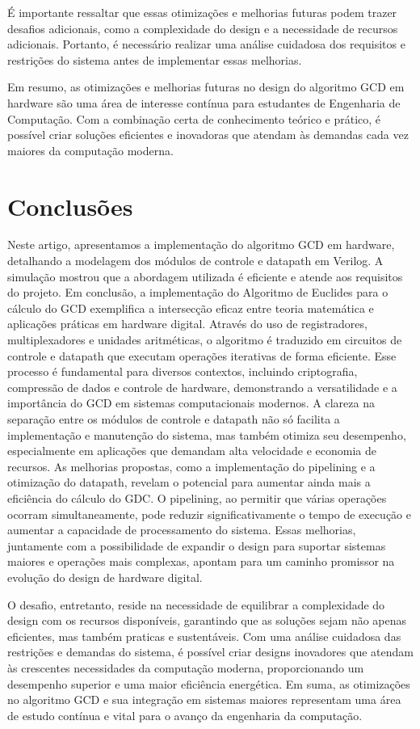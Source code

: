 \documentclass[a4paper,11pt]{article} %
\begin{document}
É importante ressaltar que essas otimizações e melhorias futuras podem trazer desafios adicionais, como a complexidade do design e a necessidade de recursos adicionais. Portanto, é necessário realizar uma análise cuidadosa dos requisitos e restrições do sistema antes de implementar essas melhorias.


Em resumo, as otimizações e melhorias futuras no design do algoritmo GCD em hardware são uma área de interesse contínua para estudantes de Engenharia de Computação. Com a combinação certa de conhecimento teórico e prático, é possível criar soluções eficientes e inovadoras que atendam às demandas cada vez maiores da computação moderna.


\section{Conclusões}

Neste artigo, apresentamos a implementação do algoritmo GCD em hardware, detalhando a modelagem dos módulos de controle e datapath em Verilog. A simulação mostrou que a abordagem utilizada é eficiente e atende aos requisitos do projeto. Em conclusão, a implementação do Algoritmo de Euclides para o cálculo do GCD exemplifica a intersecção eficaz entre teoria matemática e aplicações práticas em hardware digital. Através do uso de registradores, multiplexadores e unidades aritméticas, o algoritmo é traduzido em circuitos de controle e datapath que executam operações iterativas de forma eficiente.
Esse processo é fundamental para diversos contextos, incluindo criptografia, compressão de dados e controle de hardware, demonstrando a versatilidade e a importância do GCD em sistemas computacionais modernos. A clareza na separação entre os módulos de controle e datapath não só facilita a implementação e manutenção do sistema, mas também otimiza seu desempenho, especialmente em aplicações que demandam alta velocidade e economia de recursos. As melhorias propostas, como a implementação do pipelining e a otimização do datapath, revelam o potencial para aumentar ainda mais a eficiência do cálculo do GDC. O pipelining, ao permitir que várias operações ocorram simultaneamente, pode reduzir significativamente o tempo de execução e aumentar a capacidade de processamento do sistema.
Essas melhorias, juntamente com a possibilidade de expandir o design para suportar sistemas maiores e operações mais complexas, apontam para um caminho promissor na evolução do design de hardware digital. 

O desafio, entretanto, reside na necessidade de equilibrar a complexidade do design com os recursos disponíveis, garantindo que as soluções sejam não apenas eficientes, mas também praticas e sustentáveis. Com uma análise cuidadosa das restrições e demandas do sistema, é possível criar designs inovadores que atendam às crescentes necessidades da computação moderna, proporcionando um desempenho superior e uma maior eficiência energética. Em suma, as otimizações no algoritmo GCD e sua integração em sistemas maiores representam uma área de estudo contínua e vital para o avanço da engenharia da computação.


\end{document}

